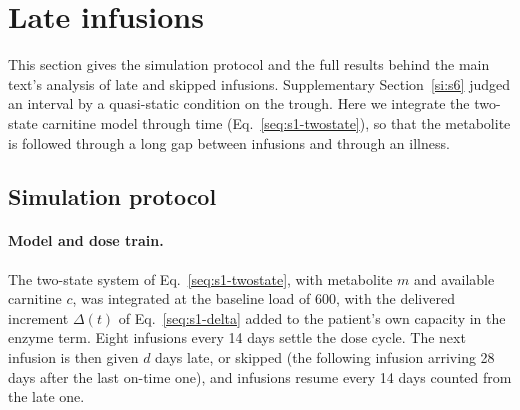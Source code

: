 \section{Late infusions}
\label{si:s7}

This section gives the simulation protocol and the full results behind the main text's analysis of
late and skipped infusions. Supplementary Section~\ref{si:s6} judged an interval by a quasi-static
condition on the trough. Here we integrate the two-state carnitine model through time
(Eq.~\eqref{seq:s1-twostate}), so that the metabolite is followed through a long gap between
infusions and through an illness.

\subsection{Simulation protocol}
\label{si:s7:protocol}

\paragraph{Model and dose train.} The two-state system of Eq.~\eqref{seq:s1-twostate}, with
metabolite $m$ and available carnitine $c$, was integrated at the baseline load of 600\um, with the
delivered increment $\Delta(t)$ of Eq.~\eqref{seq:s1-delta} added to the patient's own capacity in
the enzyme term. Eight infusions every 14 days settle the dose cycle. The next infusion is then given
$d$ days late, or skipped (the following infusion arriving 28 days after the last on-time one), and
infusions resume every 14 days counted from the late one.

